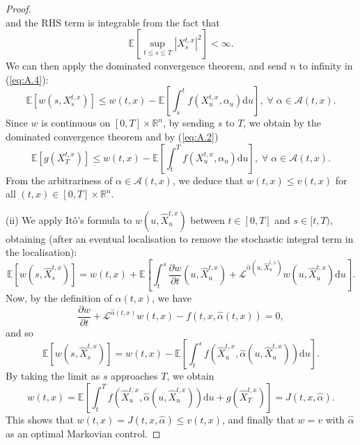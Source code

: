 \begin{proof}
\begin{equation*}
    \end{equation*}
    and the RHS term is integrable from the fact that 
    \begin{equation*}
        \mathbb{E}\left[\sup_{t\leq s\leq T}|X_s^{t,x}|^2\right]<\infty.
    \end{equation*}
    We can then apply the dominated convergence theorem, and send $n$ to infinity
    in (\ref{eq:A.4}):
    \begin{equation*}
        \mathbb{E}[w(s,X_s^{t,x})]\leq w(t,x)-\mathbb{E}\left[\int_s^tf(X_u^{t,x},\alpha_u)\mathrm du\right],\;\forall\;\alpha\in\mathcal{A}(t,x).
    \end{equation*}
    Since $w$ is continuous on $[0,T]\times\mathbb{R}^n$, by sending $s$ to $T$,
    we obtain by the dominated convergence theorem and by (\ref{eq:A.2})
    \begin{equation*}
        \mathbb{E}[g(X_T^{t,x})]\leq w(t,x)-\mathbb{E}\left[\int_t^Tf(X_u^{t,x},\alpha_u)\mathrm du\right],\;\forall\;\alpha\in\mathcal{A}(t,x).
    \end{equation*}
    From the arbitrariness of $\alpha\in\mathcal{A}(t,x)$, we deduce that $w(t,x)
    \leq v(t,x)$ for all $(t,x)\in[0,T]\times\mathbb{R}^n.$

    (ii) We apply It\^{o}'s formula to $w(u,\hat{X}_u^{t,x})$ between $t\in[0,T]$ 
    and $s\in[t,T)$, obtaining (after an eventual localisation to remove the stochastic 
    integral term in the localisation):
    \begin{equation*}
        \mathbb{E}[w(s,\hat{X}_s^{t,x})]=w(t,x)+\mathbb{E}\left[\int_t^s\frac{\partial w}{\partial t}(u,\hat{X}_u^{t,x})+\mathcal{L}^{\hat\alpha(u,\hat{X}_u^{t,x})}w(u,\hat{X}_u^{t,x})\mathrm du\right].
    \end{equation*}
    Now, by the definition of $\hat\alpha(t,x)$, we have 
    \begin{equation*}
        \frac{\partial w}{\partial t}+\mathcal{L}^{\hat\alpha(t,x)}w(t,x)-f(t,x,\hat\alpha(t,x))=0,
    \end{equation*}
    and so 
    \begin{equation*}
        \mathbb{E}[w(s,\hat{X}_s^{t,x})]=w(t,x)-\mathbb{E}\left[\int_t^sf(\hat{X}_u^{t,x},\hat{\alpha}(u,\hat{X}_u^{t,x}))\mathrm du\right].
    \end{equation*}
    By taking the limit as $s$ approaches $T$, we obtain
    \begin{equation*}
        w(t,x)=\mathbb{E}\left[\int_t^Tf(\hat{X}_u^{t,x},\hat\alpha(u,\hat{X}_u^{t,x}))\mathrm du+g(\hat{X}_T^{t,x})\right]=J(t,x,\hat{\alpha}).
    \end{equation*}
    This shows that $w(t,x)=J(t,x,\hat\alpha)\leq v(t,x)$, and finally that $w=v$
    with $\hat\alpha$ as an optimal Markovian control.
\end{proof}
